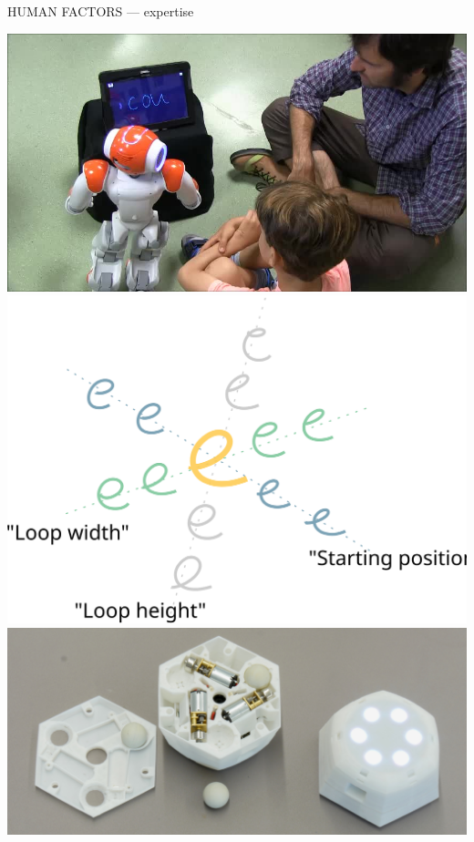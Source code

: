 \documentclass[xcolor=table]{beamer}
\begin{document}
\begin{frame}{HUMAN FACTORS --- expertise}
            \hyperlink{cowriter}{\includegraphics[height=0.2\paperheight]{cowriter/cowriter-session1_3minExcerpt_1x_thumb}}
            \hspace{0.5em}
            \hyperlink{cowriter-impl}{\includegraphics[height=0.2\paperheight]{cowriter/pca}}
            \hspace{0.5em}
            \hyperlink{cellulo}{\includegraphics[trim=19cm 0 2cm 0,clip,height=0.2\paperheight]{cellulo/hardware-design-2}}


\end{frame}
\end{document}
